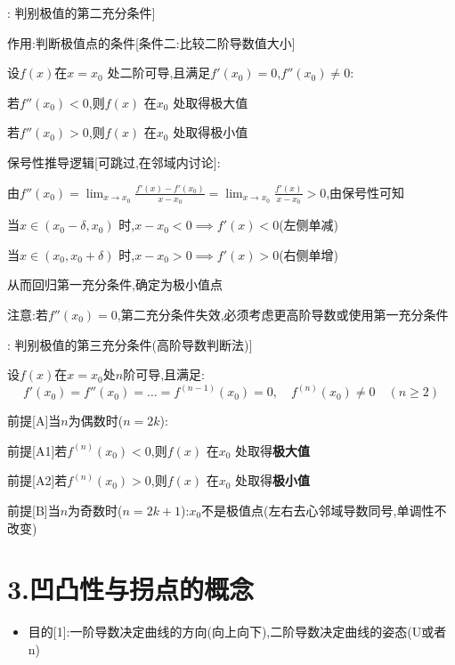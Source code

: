 \documentclass[11pt,a4paper,UTF8]{ctexart}
\begin{document}
\begin{thmbox}[原理[4]: 判别极值的第二充分条件]

作用:判断极值点的条件[条件二:比较二阶导数值大小]

设$f(x)$在$x = x_0$ 处二阶可导,且满足$f'(x_0) = 0$,$f''(x_0) \neq 0$:

  若$f''(x_0) < 0$,则$f(x)$ 在$x_0$ 处取得极大值

  若$f''(x_0) > 0$,则$f(x)$ 在$x_0$ 处取得极小值

保号性推导逻辑[可跳过,在邻域内讨论]:

  由$f''(x_0) = \lim_{x \to x_0} \frac{f'(x) - f'(x_0)}{x - x_0} = \lim_{x \to x_0} \frac{f'(x)}{x - x_0} > 0$,由保号性可知

  当$x \in (x_0 - \delta, x_0)$ 时,$x - x_0 < 0 \implies f'(x) < 0$(左侧单减)

  当$x \in (x_0, x_0 + \delta)$ 时,$x - x_0 > 0 \implies f'(x) > 0$(右侧单增)

  从而回归第一充分条件,确定为极小值点

注意:若$f''(x_0) = 0$,第二充分条件失效,必须考虑更高阶导数或使用第一充分条件

\end{thmbox}
\begin{thmbox}[原理[5]: 判别极值的第三充分条件(高阶导数判断法)]

设$f(x)$在$x = x_0$处$n$阶可导,且满足:
\begin{equation*}
f'(x_0) = f''(x_0) = \dots = f^{(n-1)}(x_0) = 0, \quad f^{(n)}(x_0) \neq 0 \quad (n \ge 2)
\end{equation*}


前提[A]当$n$为偶数时($n = 2k$):

前提[A1]若$f^{(n)}(x_0) <0$,则$f(x)$ 在$x_0$ 处取得\textbf{极大值}

前提[A2]若$f^{(n)}(x_0) > 0$,则$f(x)$ 在$x_0$ 处取得\textbf{极小值}

前提[B]当$n$为奇数时($n = 2k+1$):$x_0$不是极值点(左右去心邻域导数同号,单调性不改变)

\end{thmbox}

\section{3.凹凸性与拐点的概念}

\begin{targetbox}[本章复习目标与核心知识图谱]
\begin{itemize}
  \item 目的[1]:一阶导数决定曲线的方向(向上向下),二阶导数决定曲线的姿态(U或者n)
\end{itemize}
\end{targetbox}
\end{document}
